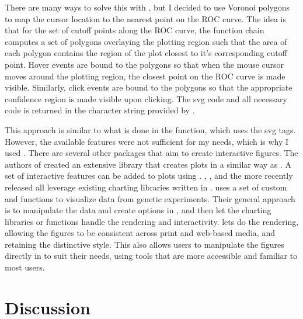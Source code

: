 \documentclass[codesnippet]{jss}
\begin{document}
There are many ways to solve this with , but I decided to use
Voronoi polygons to map the cursor location to the nearest point on the
ROC curve. The idea is that for the set of cutoff points along the ROC
curve, the  function chain computes a set of
polygons overlaying the plotting region such that the area of each
polygon contains the region of the plot closest to it's corresponding
cutoff point. Hover events are bound to the polygons so that when the
mouse cursor moves around the plotting region, the closest point on the
ROC curve is made visible. Similarly, click events are bound to the
polygons so that the appropriate confidence region is made visible upon
clicking. The svg code and all necessary  code is
returned in the character string provided by
.

This approach is similar to what is done in the 
 function, which uses the svg 
tags. However, the available features were not sufficient for my needs,
which is why I used . There are several other 
packages that aim to create interactive figures. The authors of
 \citep{animint} created an extensive 
library that creates plots in a similar way as . A set of
interactive features can be added to plots using .
 \citep{ggvis},  \citep{rcharts}, and the more
recently released  \citep{htmlwidgets} all leverage
existing charting libraries written in .
 \citep{qtlcharts} uses a set of custom
 and  functions to visualize data from
genetic experiments. Their general approach is to manipulate the data
and create options in , and then let the charting libraries
or functions handle the rendering and interactivity.  lets
 do the rendering, allowing the figures to be consistent
across print and web-based media, and retaining the distinctive
 style. This also allows users to manipulate the figures
directly in  to suit their needs, using tools that are more
accessible and familiar to most  users.

\section{Discussion}\label{discussion}
\end{document}
